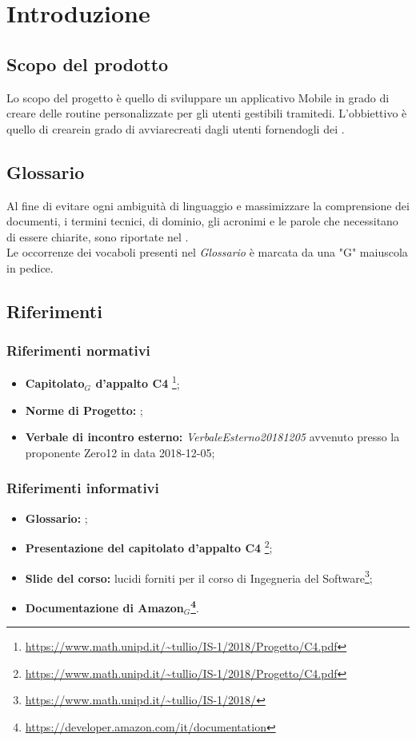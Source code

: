 \chapter{Introduzione}

\section{Scopo del prodotto}
Lo scopo del progetto è quello di sviluppare un applicativo Mobile in grado di creare delle routine personalizzate per gli utenti gestibili tramitedi. L'obbiettivo è quello di crearein grado di avviarecreati dagli utenti fornendogli dei .
\section{Glossario}
Al fine di evitare ogni ambiguità di linguaggio e massimizzare la comprensione dei documenti, i termini tecnici, di dominio, gli acronimi e le parole che necessitano di essere chiarite, sono riportate nel \glossariodocumento.\\
Le occorrenze dei vocaboli presenti nel \textit{Glossario} è marcata da una "G" maiuscola in pedice.

\section{Riferimenti}

\subsection{Riferimenti normativi}
\begin{itemize}
	
	\item \textbf{Capitolato$_{G}$ d'appalto C4} \footnote{\url{https://www.math.unipd.it/~tullio/IS-1/2018/Progetto/C4.pdf}};
	\item \textbf{Norme di Progetto:} \textit{\normediprogetto};
	\item \textbf{Verbale di incontro esterno:} \textit{VerbaleEsterno20181205} avvenuto presso la proponente Zero12 in data 2018-12-05;

\end{itemize}

\subsection{Riferimenti informativi}
\begin{itemize}
	
	\item \textbf{Glossario:} \textit{\glossariodocumento};
	\item \textbf{Presentazione del capitolato d'appalto C4} \footnote{\url{https://www.math.unipd.it/~tullio/IS-1/2018/Progetto/C4.pdf}};
	\item \textbf{Slide del corso:} lucidi forniti per il corso di Ingegneria del Software\footnote{\url{https://www.math.unipd.it/~tullio/IS-1/2018/}};
	\item \textbf{Documentazione di Amazon$_{G}$\footnote{\url{https://developer.amazon.com/it/documentation}}}.
\end{itemize}
